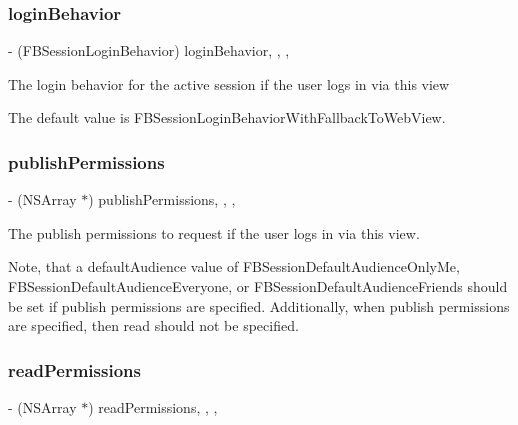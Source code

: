 \subsubsection{\texorpdfstring{login\+Behavior}{loginBehavior}}
{\footnotesize\ttfamily -\/ (F\+B\+Session\+Login\+Behavior) login\+Behavior\hspace{0.3cm}{\ttfamily [read]}, {\ttfamily [write]}, {\ttfamily [nonatomic]}, {\ttfamily [assign]}}

The login behavior for the active session if the user logs in via this view

The default value is F\+B\+Session\+Login\+Behavior\+With\+Fallback\+To\+Web\+View. \mbox{\label{interfaceFBLoginView_a024435e287685d24b2691312fbe96200}} 
\subsubsection{\texorpdfstring{publish\+Permissions}{publishPermissions}}
{\footnotesize\ttfamily -\/ (N\+S\+Array $\ast$) publish\+Permissions\hspace{0.3cm}{\ttfamily [read]}, {\ttfamily [write]}, {\ttfamily [nonatomic]}, {\ttfamily [copy]}}

The publish permissions to request if the user logs in via this view.

Note, that a default\+Audience value of F\+B\+Session\+Default\+Audience\+Only\+Me, F\+B\+Session\+Default\+Audience\+Everyone, or F\+B\+Session\+Default\+Audience\+Friends should be set if publish permissions are specified. Additionally, when publish permissions are specified, then read should not be specified. \mbox{\label{interfaceFBLoginView_a37d330ba79d55dfb412e8f24c0d96a8b}} 
\subsubsection{\texorpdfstring{read\+Permissions}{readPermissions}}
{\footnotesize\ttfamily -\/ (N\+S\+Array $\ast$) read\+Permissions\hspace{0.3cm}{\ttfamily [read]}, {\ttfamily [write]}, {\ttfamily [nonatomic]}, {\ttfamily [copy]}}

